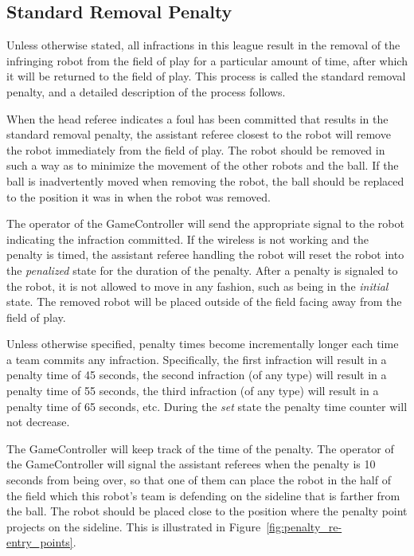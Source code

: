 \documentclass[12pt]{article}
\begin{document}
\subsection{Standard Removal Penalty}
\label{sec:removal_penalty}

Unless otherwise stated, all infractions in this league result in the removal of the infringing robot from the field of play for a particular amount of time, after which it will be returned to the field of play. This process is called the standard removal penalty, and a detailed description of the process follows.

When the head referee indicates a foul has been committed that results in the standard removal penalty, the assistant referee closest to the robot will remove the robot immediately from the field of play. The robot should be removed in such a way as to minimize the movement of the other robots and the ball. If the ball is inadvertently moved when removing the robot, the ball should be replaced to the position it was in when the robot was removed.

The operator of the GameController will send the appropriate signal to the robot indicating the infraction committed. If the wireless is not working and the penalty is timed, the assistant referee handling the robot will reset the robot into the \emph{penalized} state for the duration of the penalty. After a penalty is signaled to the robot, it is not allowed to move in any fashion, such as being in the \emph{initial} state. The removed robot will be placed outside of the field facing away from the field of play.

Unless otherwise specified, penalty times become incrementally longer each time a team commits any infraction.  Specifically, the first infraction will result in a penalty time of 45 seconds, the second infraction (of any type) will result in a penalty time of 55 seconds, the third infraction (of any type) will result in a penalty time of 65 seconds, etc.  During the \emph{set} state the penalty time counter will not decrease.

The GameController will keep track of the time of the penalty. The operator of the GameController will signal the assistant referees when the penalty is 10 seconds from being over, so that one of them can place the robot in the half of the field which this robot's team is defending on the sideline that is farther from the ball. The robot should be placed close to the position where the penalty point projects on the sideline. This is illustrated in Figure~\ref{fig:penalty_re-entry_points}. 
\end{document}
